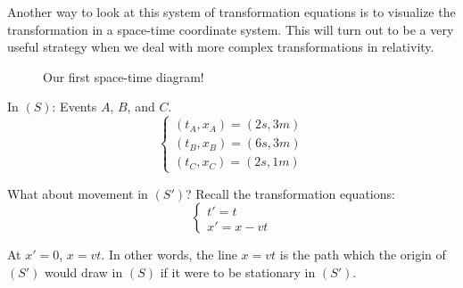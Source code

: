 \documentclass[a4paper,11pt]{article}
\numberwithin{equation}{section}
\begin{document}
  \noindent Another way to look at this system of transformation equations is to visualize the transformation in a space-time coordinate system. This will turn out to be a very useful strategy when we deal with more complex transformations in relativity.
  \begin{figure}[!hbt] %
  \centering
    \caption{Our first space-time diagram!}
    \label{fig: spacetimediagram}
  \end{figure}
  
  \noindent In $(S)$: Events $A$, $B$, and $C$.
  \begin{equation} \label{eq:11}
  \begin{cases} 
  (t_{A}, x_{A}) = (2s, 3m) \\
  (t_{B}, x_{B}) = (6s, 3m) \\
  (t_{C}, x_{C}) = (2s, 1m)
  \end{cases}
  \end{equation}
  
  \noindent What about movement in $(S')$? Recall the transformation equations:
  \begin{equation} \label{eq:12}
  \begin{cases} 
  t'=t \\
  x'=x-vt
  \end{cases}
  \end{equation}
  
  \noindent At $x'=0$, $x=vt$. In other words, the line $x=vt$ is the path which the origin of $(S')$ would draw in $(S)$ if it were to be stationary in $(S')$.
 
\end{document}
